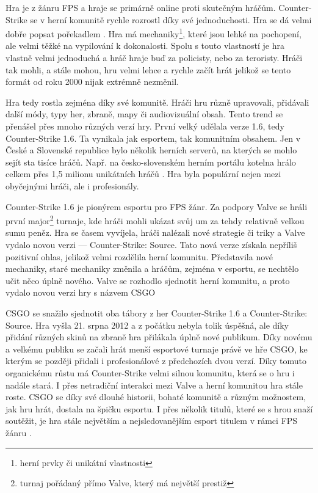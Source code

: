 Hra je z žánru \ac{FPS} a hraje se primárně online proti skutečným hráčům. Counter-Strike se v herní komunitě rychle rozrostl díky své jednoduchosti.
Hra se dá velmi dobře popsat pořekadlem . Hra má mechaniky\footnote{herní prvky či unikátní vlastnosti},
které jsou lehké na pochopení, ale velmi těžké na vypilování k dokonalosti. Spolu s touto vlastností je hra vlastně velmi jednoduchá a hráč hraje buď za policisty, nebo za
teroristy. Hráči tak mohli, a stále mohou, hru velmi lehce a rychle začít hrát 
{\color{red}
jelikož se tento formát od roku 2000 nijak extrémně nezměnil.
}

Hra tedy rostla zejména díky své komunitě. Hráči hru různě upravovali, přidávali další módy, typy her, zbraně, mapy či audiovizuální obsah. Tento trend se přenášel přes
mnoho různých verzí hry. První velký  udělala verze 1.6, tedy Counter-Strike 1.6. Ta vynikala jak esportem, tak komunitním obsahem. Jen v České a
Slovenské republice bylo několik herních serverů, na kterých se mohlo sejít sta tisíce hráčů. Např. na česko-slovenském herním portálu kotelna hrálo celkem přes
1,5 milionu unikátních hráčů \cite{csko2021}. Hra byla populární nejen mezi obyčejnými hráči, ale i profesionály.

Counter-Strike 1.6 je pionýrem esportu pro \ac{FPS} žánr. Za podpory Valve se hráli první major\footnote{turnaj pořádaný přímo Valve, který má největší prestiž} turnaje,
kde hráči mohli ukázat svůj um za tehdy relativně velkou sumu peněz. Hra se časem vyvíjela, hráči nalézali nové strategie či triky a Valve vydalo novou verzi ---  Counter-Strike:
Source. Tato nová verze získala nepříliš pozitivní ohlas, jelikož velmi rozdělila herní komunitu. Představila nové mechaniky, staré mechaniky změnila a hráčům, zejména v esportu,
se nechtělo učit něco úplně nového. Valve se rozhodlo sjednotit herní komunitu, a proto vydalo novou verzi hry {\color{red}
s názvem
}
\ac{CSGO}

\ac{CSGO} se snažilo sjednotit oba tábory 
{\color{red}
z her 
}
Counter-Strike 1.6 a Counter-Strike: Source. Hra vyšla 21. srpna 2012 a z počátku nebyla tolik úspěšná, ale díky přidání různých
skinů \cite{Valve2013} na zbraně hra přilákala úplně nové publikum. Díky novému a velkému publiku se začali hrát menší esportové turnaje právě ve hře \ac{CSGO}, ke kterým se
později přidali i profesionálové z předchozích dvou verzí. Díky tomuto organickému růstu má Counter-Strike velmi silnou komunitu, která se o hru i nadále stará. I přes
netradiční interakci mezi Valve a herní komunitou hra stále roste. \ac{CSGO} se díky své dlouhé historii, bohaté komunitě a různým možnostem, jak hru hrát, dostala na špičku
esportu. I přes několik titulů, které se s hrou snaží soutěžit, je hra stále největším a nejsledovanějším esport titulem v rámci \ac{FPS} žánru \cite{Henningson2020}.

